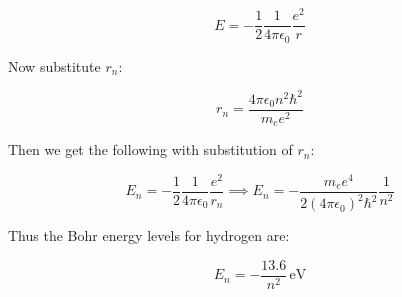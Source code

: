 \documentclass[
	a4paper,
	parskip=half,
    pagesize=auto,      		%
    listof=totoc,   		%
    bibliography=totoc,
	11pt
]{scrartcl}
\begin{document}
\begin{equation}
	E
	=
	-
	\frac{1}{2}
	\frac{1}{4\pi\epsilon_0}
	\frac{e^2}{r}
\end{equation}

Now substitute $r_n$:

\begin{equation}
	r_n
	=
	\frac{4\pi\epsilon_0 n^2 \hbar^2}{m_e e^2}
\end{equation}

Then we get the following with substitution of $r_n$:

\begin{equation}
	E_n
	=
	-
	\frac{1}{2}
	\frac{1}{4\pi\epsilon_0}
	\frac{e^2}{r_n}
	\implies E_n = - \frac{m_e e^4}{2(4\pi\epsilon_0)^2 \hbar^2}\frac{1}{n^2}
\end{equation}

Thus the Bohr energy levels for hydrogen are:

\begin{equation}
	E_n
	=
	-
	\frac{13.6}{n^2}\,\mathrm{eV}
\end{equation}









    \cleardoublepage
    
    

\end{document}
